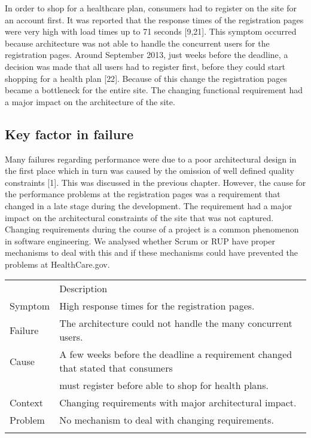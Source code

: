 \documentclass[]{article}
\begin{document}
In order to shop for a healthcare plan, consumers had to register on the
site for an account first. It was reported that the response times of
the registration pages were very high with load times up to 71 seconds
{[}9,21{]}. This symptom occurred because architecture was not able to
handle the concurrent users for the registration pages. Around September
2013, just weeks before the deadline, a decision was made that all users
had to register first, before they could start shopping for a health
plan {[}22{]}. Because of this change the registration pages became a
bottleneck for the entire site. The changing functional requirement had
a major impact on the architecture of the site.

\subsection{Key factor in failure}\label{key-factor-in-failure}

Many failures regarding performance were due to a poor architectural
design in the first place which in turn was caused by the omission of
well defined quality constraints {[}1{]}. This was discussed in the
previous chapter. However, the cause for the performance problems at the
registration pages was a requirement that changed in a late stage during
the development. The requirement had a major impact on the architectural
constraints of the site that was not captured. Changing requirements
during the course of a project is a common phenomenon in software
engineering. We analysed whether Scrum or RUP have proper mechanisms to
deal with this and if these mechanisms could have prevented the problems
at HealthCare.gov.

\begin{longtable}[c]{@{}ll@{}}
\toprule\addlinespace
& Description
\\\addlinespace
\midrule\endhead
Symptom & High response times for the registration pages.
\\\addlinespace
Failure & The architecture could not handle the many concurrent users.
\\\addlinespace
Cause & A few weeks before the deadline a requirement changed that
stated that consumers
\\\addlinespace
& must register before able to shop for health plans.
\\\addlinespace
Context & Changing requirements with major architectural impact.
\\\addlinespace
Problem & No mechanism to deal with changing requirements.
\\\addlinespace
\bottomrule
\end{longtable}
\end{document}
